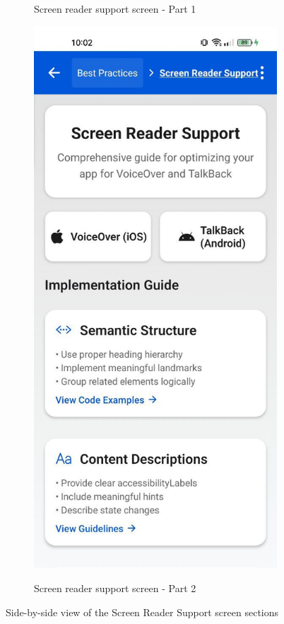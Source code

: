 \begin{figure}[ht]
\begin{subfigure}[b]{0.48\textwidth}
        \caption{Screen reader support screen - Part 1}
        \label{fig:screen-reader-left}
    \end{subfigure}
    \hfill
    \begin{subfigure}[b]{0.48\textwidth}
        \centering
        \includegraphics[width=\linewidth, alt={Second part of the Screen Reader Support Screen}]{img/screenreader2.jpg}
        \caption{Screen reader support screen - Part 2}
        \label{fig:screen-reader-right}
    \end{subfigure}
    \caption{Side-by-side view of the Screen Reader Support screen sections}
    \label{fig:screen_reader_screens_sidebyside}
\end{figure}


